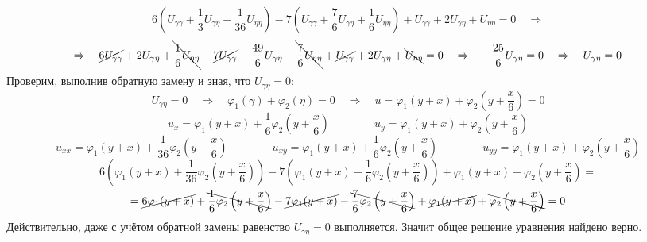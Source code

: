 \documentclass[a4paper]{article}
\begin{document}
$$6\left( U_{\gamma\gamma} + \frac{1}{3}U_{\gamma\eta} + \frac{1}{36}U_{\eta\eta} \right)-7\left( U_{\gamma\gamma} + \frac{7}{6}U_{\gamma\eta} + \frac{1}{6}U_{\eta\eta} \right)+U_{\gamma\gamma} + 2U_{\gamma\eta} + U_{\eta\eta}=0 \quad\Rightarrow$$
$$\Rightarrow\quad\cancel{6U_{\gamma\gamma}} + 2U_{\gamma\eta} + \bcancel{\frac{1}{6}U_{\eta\eta}}-\cancel{7U_{\gamma\gamma}} - \frac{49}{6}U_{\gamma\eta} - \bcancel{\frac{7}{6}U_{\eta\eta}} +\cancel{U_{\gamma\gamma}} + 2U_{\gamma\eta} + \bcancel{U_{\eta\eta}}=0 \quad\Rightarrow\quad - \frac{25}{6} U_{\gamma\eta} = 0 \quad\Rightarrow\quad U_{\gamma\eta} = 0$$\newpage
Проверим, выполнив обратную замену и зная, что $U_{\gamma\eta} = 0$:
$$U_{\gamma\eta} = 0 \quad\Rightarrow\quad \varphi_1(\gamma) + \varphi_2(\eta) = 0 \quad\Rightarrow\quad u = \varphi_1(y+x) + \varphi_2\left( y+\frac{x}{6} \right) = 0$$
$$u_x = \varphi_1(y+x) + \frac{1}{6}\varphi_2\left( y+\frac{x}{6} \right)\qquad\qquad u_y = \varphi_1(y+x) + \varphi_2\left( y+\frac{x}{6} \right)$$
$$u_{xx} = \varphi_1(y+x) + \frac{1}{36}\varphi_2\left( y+\frac{x}{6} \right)\qquad\qquad u_{xy} = \varphi_1(y+x) + \frac{1}{6}\varphi_2\left( y+\frac{x}{6} \right)\qquad\qquad u_{yy} = \varphi_1(y+x) + \varphi_2\left( y+\frac{x}{6} \right)$$
$$6\left( \varphi_1(y+x) + \frac{1}{36}\varphi_2\left( y+\frac{x}{6} \right) \right) -7 \left( \varphi_1(y+x) + \frac{1}{6}\varphi_2\left( y+\frac{x}{6} \right) \right) + \varphi_1(y+x) + \varphi_2\left( y+\frac{x}{6} \right) =$$
$$= \cancel{6\varphi_1(y+x)} + \bcancel{\frac{1}{6}\varphi_2\left( y+\frac{x}{6} \right)} -\cancel{7 \varphi_1(y+x)} - \bcancel{\frac{7}{6}\varphi_2\left( y+\frac{x}{6} \right)} + \cancel{\varphi_1(y+x)} + \bcancel{\varphi_2\left( y+\frac{x}{6} \right)} = 0$$
Действительно, даже с учётом обратной замены равенство $U_{\gamma\eta} = 0$ выполняется. Значит общее решение уравнения найдено верно.
\end{document}
